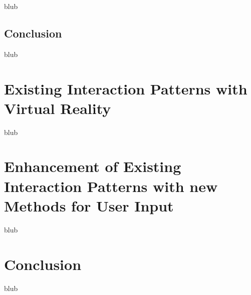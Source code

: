 blub




\subsection{Conclusion}

blub




\section{Existing Interaction Patterns with Virtual Reality}

\label{SectionLiteratureReviewSRQ2}

blub




\section{Enhancement of Existing Interaction Patterns with new Methods for User Input}

\label{SectionLiteratureReviewSRQ3}

blub





\section{Conclusion}

\label{SectionLiteratureReviewConclusion}

blub

